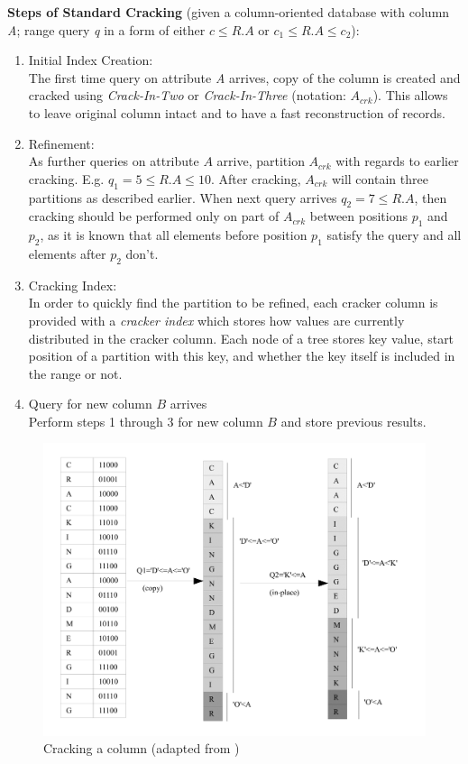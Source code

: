 \documentclass[10pt, conference, compsocconf]{IEEEtran}
\begin{document}
\textbf{Steps of Standard Cracking} (given a column-oriented database with column \textit{A}; range query \textit{q} in a form of either \textit{$c \leq R.A$} or \textit{$c_1 \leq R.A \leq c_2$}): \\
\begin{enumerate}
\item{Initial Index Creation:}\\
The first time query on attribute \textit{A} arrives, copy of the column is created and cracked using \emph{Crack-In-Two} or \emph{Crack-In-Three} (notation:  $A_{crk}$). This allows to leave original column intact and to have a fast reconstruction of records. \\
\item{Refinement:}\\
As further queries on attribute $A$ arrive, partition $A_{crk}$ with regards to earlier cracking. E.g. $q_1 = 5 \leq R.A \leq 10$. After cracking, $A_{crk}$ will contain three partitions as described earlier. When next query arrives $q_2 = 7 \leq R.A$, then cracking should be performed only on part of $A_{crk}$ between positions $p_1$ and $p_2$, as it is known that all elements before position $p_1$ satisfy the query and all elements after $p_2$ don't.\\
\item{Cracking Index:}\\
In order to quickly find the partition to be refined, each cracker column is provided with a \emph{cracker index} which stores how values are currently distributed in the cracker column. Each node of a tree stores key value, start position of a partition with this key, and whether the key itself is included in the range or not.\\
\item{Query for new column $B$ arrives}\\
Perform steps 1 through 3 for new column $B$ and store previous results.
\end{enumerate}

\begin{figure}[h]
\centering
\includegraphics[width=\columnwidth]{cracking.png}
\caption{Cracking a column (adapted from \cite{cracking})}
\end{figure}
\end{document}
